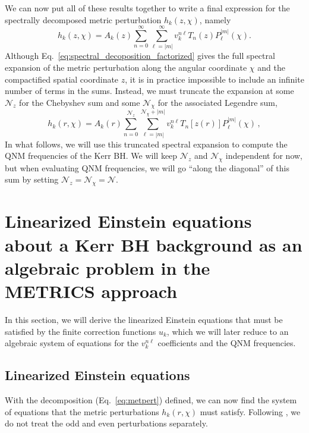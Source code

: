 \documentclass[aps,prx,amsmath,floats,floatfix,twocolumn,
  superscriptaddress,nofootinbib,showpacs]{revtex4-1}
\begin{document}
We can now put all of these results together to write a final expression for the spectrally decomposed metric perturbation
$h_k(z, \chi)$, namely
\begin{equation}\label{eq:spectral_decoposition_factorized}
h_k (z, \chi) = A_k(z) \sum_{n=0}^{\infty} \sum_{\ell=|m|}^{\infty} v_k^{n \ell}  T_{n}(z) P^{|m|}_{\ell}(\chi). 
\end{equation}
Although Eq.~\eqref{eq:spectral_decoposition_factorized} gives the full spectral expansion of the metric perturbation along the angular coordinate $\chi$ and the compactified spatial coordinate $z$, it is in practice impossible to include an infinite number of terms in the sums.
Instead, we must truncate the expansion at some $\mathcal{N}_z$ for the Chebyshev sum and some $\mathcal{N}_{\chi}$ for the associated Legendre sum, 
\begin{equation}\label{eq:spectral_decoposition_factorized_finite}
h_k (r, \chi) = A_k(r) \sum_{n=0}^{\mathcal{N}_z} \sum_{\ell=|m|}^{\mathcal{N}_{\chi}+|m|} v_k^{n \ell}  T_{n}\left[z(r)\right] P^{|m|}_{\ell}(\chi)\,,
\end{equation}
In what follows, we will use this truncated spectral expansion to compute the QNM frequencies of the Kerr BH. We will keep $\mathcal{N}_z$ and $\mathcal{N}_{\chi}$ independent for now, but when evaluating QNM frequencies, we will go ``along the diagonal'' of this sum by setting $\mathcal{N}_z = \mathcal{N}_{\chi} = \mathcal{N}$.

\section{Linearized Einstein equations about a Kerr BH background as an algebraic problem in the METRICS approach}
\label{sec:line-EEs}

In this section, we will derive the linearized Einstein equations that must be satisfied by the finite correction functions $u_{k}$, which we will later reduce to an algebraic system of equations for the $v_{k}^{n \ell}$ coefficients and the QNM frequencies. 

\subsection{Linearized Einstein equations}

With the decomposition (Eq.~\eqref{eq:metpert}) defined, we can now find the system of equations that the metric perturbations $h_k(r,\chi)$ must satisfy. 
Following \cite{Chung:2023zdq}, we do not treat the odd and even perturbations separately.
\end{document}
